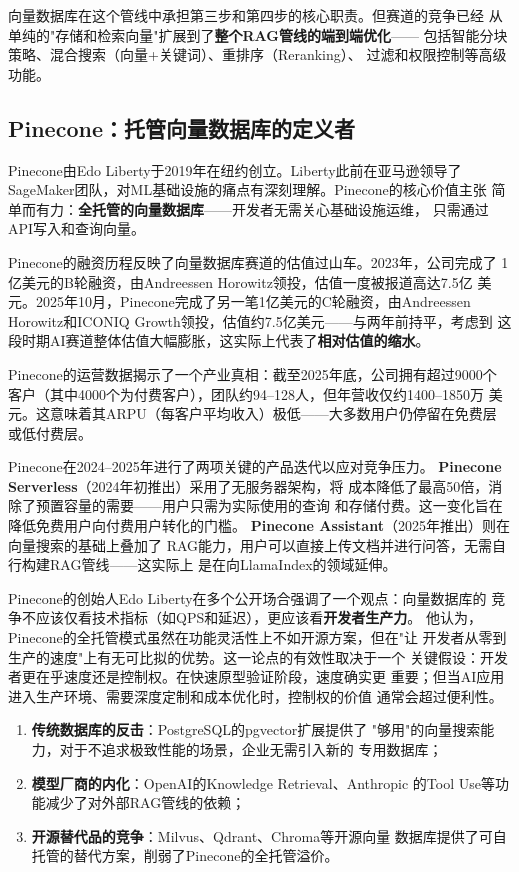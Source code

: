 向量数据库在这个管线中承担第三步和第四步的核心职责。但赛道的竞争已经
从单纯的"存储和检索向量"扩展到了\textbf{整个RAG管线的端到端优化}——
包括智能分块策略、混合搜索（向量+关键词）、重排序（Reranking）、
过滤和权限控制等高级功能。

\subsection{Pinecone：托管向量数据库的定义者}
\label{subsec:pinecone}

Pinecone由Edo Liberty于2019年在纽约创立。Liberty此前在亚马逊领导了
SageMaker团队，对ML基础设施的痛点有深刻理解。Pinecone的核心价值主张
简单而有力：\textbf{全托管的向量数据库}——开发者无需关心基础设施运维，
只需通过API写入和查询向量。

Pinecone的融资历程反映了向量数据库赛道的估值过山车。2023年，公司完成了
1亿美元的B轮融资，由Andreessen Horowitz领投，估值一度被报道高达7.5亿
美元。2025年10月，Pinecone完成了另一笔1亿美元的C轮融资，由Andreessen
Horowitz和ICONIQ Growth领投，估值约7.5亿美元——与两年前持平，考虑到
这段时期AI赛道整体估值大幅膨胀，这实际上代表了\textbf{相对估值的缩水}。

Pinecone的运营数据揭示了一个产业真相：截至2025年底，公司拥有超过9000个
客户（其中4000个为付费客户），团队约94--128人，但年营收仅约1400--1850万
美元。这意味着其ARPU（每客户平均收入）极低——大多数用户仍停留在免费层
或低付费层。

Pinecone在2024--2025年进行了两项关键的产品迭代以应对竞争压力。
\textbf{Pinecone Serverless}（2024年初推出）采用了无服务器架构，将
成本降低了最高50倍，消除了预置容量的需要——用户只需为实际使用的查询
和存储付费。这一变化旨在降低免费用户向付费用户转化的门槛。
\textbf{Pinecone Assistant}（2025年推出）则在向量搜索的基础上叠加了
RAG能力，用户可以直接上传文档并进行问答，无需自行构建RAG管线——这实际上
是在向LlamaIndex的领域延伸。

Pinecone的创始人Edo Liberty在多个公开场合强调了一个观点：向量数据库的
竞争不应该仅看技术指标（如QPS和延迟），更应该看\textbf{开发者生产力}。
他认为，Pinecone的全托管模式虽然在功能灵活性上不如开源方案，但在"让
开发者从零到生产的速度"上有无可比拟的优势。这一论点的有效性取决于一个
关键假设：开发者更在乎速度还是控制权。在快速原型验证阶段，速度确实更
重要；但当AI应用进入生产环境、需要深度定制和成本优化时，控制权的价值
通常会超过便利性。

\begin{warnbox}[向量数据库赛道的三重挤压]
\begin{enumerate}
  \item \textbf{传统数据库的反击}：PostgreSQL的pgvector扩展提供了
    "够用"的向量搜索能力，对于不追求极致性能的场景，企业无需引入新的
    专用数据库；
  \item \textbf{模型厂商的内化}：OpenAI的Knowledge Retrieval、Anthropic
    的Tool Use等功能减少了对外部RAG管线的依赖；
  \item \textbf{开源替代品的竞争}：Milvus、Qdrant、Chroma等开源向量
    数据库提供了可自托管的替代方案，削弱了Pinecone的全托管溢价。
\end{enumerate}
\end{warnbox}

